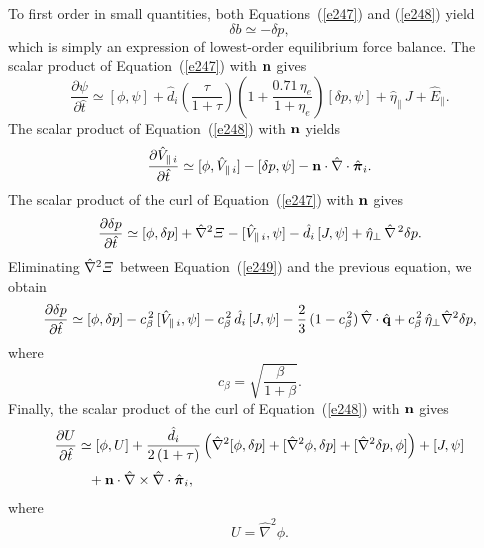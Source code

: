 \documentclass[notitlepage,12pt]{article}
\newcommand{\bpi}{\mbox{\boldmath$\pi$}}
\begin{document}
 To first order in small quantities, both Equations~(\ref{e247}) and (\ref{e248}) yield
 \begin{equation}
 \delta b \simeq - \delta p,
 \end{equation}
 which is simply an expression of lowest-order equilibrium force balance. The scalar product of Equation~(\ref{e247}) with ${\bf n}$ gives
 \begin{equation}\label{e252}
 \frac{\partial\psi}{\partial\hat{t}}\simeq [\phi,\psi] +\hat{d}_i\!\left(\frac{\tau}{1+\tau}\right)\left(1+\frac{0.71\,\eta_e}{1+\eta_e}\right)
 [\delta p,\psi] + \hat{\eta}_\parallel\,J + \hat{E}_\parallel.
 \end{equation}
  The scalar product of Equation~(\ref{e248}) with ${\bf n}$ yields
 \begin{equation}\label{e254}
 \frac{\partial\hat{V}_{\parallel\,i}}{\partial\hat{t}}\simeq [\phi,\hat{V}_{\parallel\,i}]-[\delta p,\psi] -{\bf n}\cdot\hat{\nabla}\cdot\hat{\bpi}_i.
 \end{equation}
 The scalar product of the curl of Equation~(\ref{e247}) with ${\bf n}$ gives
 \begin{equation}
 \frac{\partial\delta p}{\partial\hat{t}}\simeq [\phi,\delta p]+\hat{\nabla}^2{\mit\Xi}-[\hat{V}_{\parallel\,i},\psi]
 -\hat{d}_i\,[J,\psi] +\hat{\eta}_\perp\,\hat{\nabla}^{\,2}\delta p.
 \end{equation}
 Eliminating $\hat{\nabla}^2{\mit\Xi}$ between Equation~(\ref{e249}) and the previous equation, we obtain
 \begin{align}\label{e256}
 \frac{\partial\delta p}{\partial\hat{t}}\simeq [\phi,\delta p]-c_\beta^{\,2}\,[\hat{V}_{\parallel\,i},\psi]-c_\beta^{\,2}\,\hat{d}_i\,[J,\psi]
 -\frac{2}{3}\,(1-c_\beta^{\,2})\,\hat{\nabla}\cdot\hat{\bf q} +c_\beta^{\,2}\,\hat{\eta}_\perp \hat{\nabla}^2\delta p,
 \end{align}
 where
 \begin{equation}\label{e257}
 c_\beta = \sqrt{\frac{\beta}{1+\beta}}.
 \end{equation}
 Finally, the scalar product of the curl of Equation~(\ref{e248}) with ${\bf n}$ gives 
 \begin{align}\label{e258}
 \frac{\partial U}{\partial\hat{t}}& \simeq [\phi,U] + \frac{\hat{d}_i}{2\,(1+\tau)}\left(
 \hat{\nabla}^2[\phi,\delta p] + [\hat{\nabla}^2\phi,\delta p] + [\hat{\nabla}^2 \delta p,\phi]\right)
 + [J,\psi] \nonumber\\[0.5ex]&\phantom{=} + {\bf n}\cdot\hat{\nabla}\times \hat{\nabla}\cdot\hat{\bpi}_i,
 \end{align}
 where 
 \begin{equation}
 U = \hat{\nabla}^{2}\phi.
 \end{equation}
 
\end{document}
